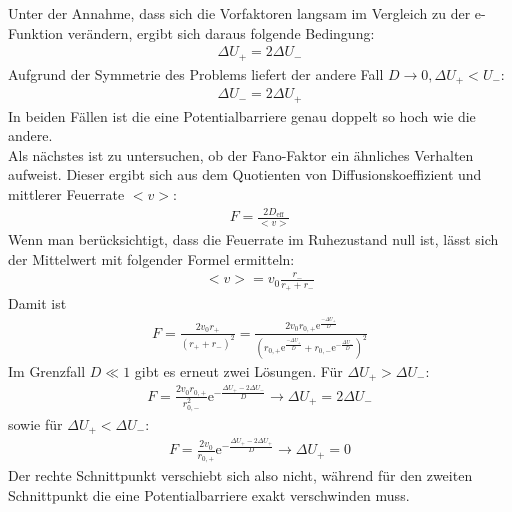 \documentclass[12pt,a4paper]{article}
\begin{document}
Unter der Annahme, dass sich die Vorfaktoren langsam im Vergleich zu der e-Funktion verändern, ergibt sich daraus folgende Bedingung:
\begin{align*}
\Delta U_+=2\Delta U_-
\end{align*}
Aufgrund der Symmetrie des Problems liefert der andere Fall $D\rightarrow 0,\Delta U_+<U_-$:
\begin{align*}
\Delta U_-=2\Delta U_+
\end{align*}
In beiden Fällen ist die eine Potentialbarriere genau doppelt so hoch wie die andere.\\
Als nächstes ist zu untersuchen, ob der Fano-Faktor ein ähnliches Verhalten aufweist. Dieser ergibt sich aus dem Quotienten von Diffusionskoeffizient und mittlerer Feuerrate $<v>$:
\begin{align*}
F=\frac{2D_{\text{eff}}}{<v>}
\end{align*}
Wenn man berücksichtigt, dass die Feuerrate im Ruhezustand null ist, lässt sich der Mittelwert mit folgender Formel ermitteln:
\begin{align*}
<v>=v_0\frac{r_-}{r_++r_-}
\end{align*}
Damit ist
\begin{align*}
F=\frac{2v_0r_+}{(r_++r_-)^2}=\frac{2v_0r_{0,+}\text{e}^{\frac{-\Delta U_+}{D}}}{\left(r_{0,+}\text{e}^{\frac{-\Delta U_+}{D}}+r_{0,-}\text{e}^{-\frac{\Delta U_-}{D}}\right)^2}
\end{align*}
Im Grenzfall $D\ll1$ gibt es erneut zwei Lösungen. Für $\Delta U_+ > \Delta U_-$:
\begin{align*}
F=\frac{2v_0r_{0,+}}{r_{0,-}^2}\text{e}^{-\frac{\Delta U_+-2\Delta U_-}{D}} \rightarrow \Delta U_+=2\Delta U_-
\end{align*}
sowie für $\Delta U_+ < \Delta U_-$:
\begin{align*}
F=\frac{2v_0}{r_{0,+}}\text{e}^{-\frac{\Delta U_+-2\Delta U_+}{D}} \rightarrow \Delta U_+=0
\end{align*}
Der rechte Schnittpunkt verschiebt sich also nicht, während für den zweiten Schnittpunkt die eine Potentialbarriere exakt verschwinden muss.
\end{document}
